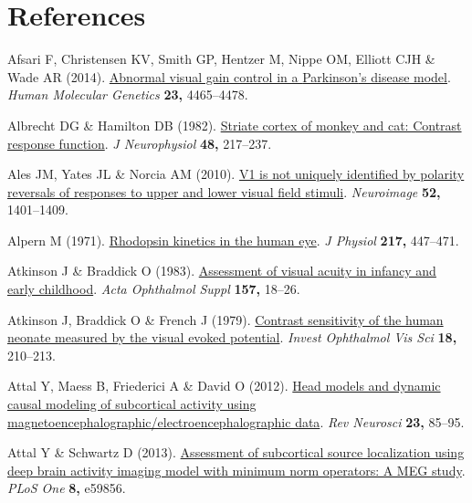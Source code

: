 \documentclass[
  letterpaper,
  DIV=11,
  numbers=noendperiod]{scrartcl}
\newlength{\cslhangindent}
\newenvironment{CSLReferences}[2] %
 {\begin{list}{}{%
  \setlength{\itemindent}{0pt}
  \setlength{\leftmargin}{0pt}
  \setlength{\parsep}{0pt}
  \ifodd #1
   \setlength{\leftmargin}{\cslhangindent}
   \setlength{\itemindent}{-1\cslhangindent}
  \fi
  \setlength{\itemsep}{#2\baselineskip}}}
 {\end{list}}
\begin{document}
\section*{References}\label{references}

\label{refs}
\begin{CSLReferences}{1}{1}
Afsari F, Christensen KV, Smith GP, Hentzer M, Nippe OM, Elliott CJH \&
Wade AR (2014). \href{https://doi.org/10.1093/hmg/ddu159}{Abnormal
visual gain control in a {Parkinson}'s disease model}. \emph{Human
Molecular Genetics} \textbf{23,} 4465--4478.

Albrecht DG \& Hamilton DB (1982).
\href{https://doi.org/10.1152/jn.1982.48.1.217}{Striate cortex of monkey
and cat: Contrast response function}. \emph{J Neurophysiol} \textbf{48,}
217--237.

Ales JM, Yates JL \& Norcia AM (2010).
\href{https://doi.org/10.1016/j.neuroimage.2010.05.016}{V1 is not
uniquely identified by polarity reversals of responses to upper and
lower visual field stimuli}. \emph{Neuroimage} \textbf{52,} 1401--1409.

Alpern M (1971).
\href{https://doi.org/10.1113/jphysiol.1971.sp009580}{Rhodopsin kinetics
in the human eye}. \emph{J Physiol} \textbf{217,} 447--471.

Atkinson J \& Braddick O (1983).
\href{https://doi.org/10.1111/j.1755-3768.1983.tb03927.x}{Assessment of
visual acuity in infancy and early childhood}. \emph{Acta Ophthalmol
Suppl} \textbf{157,} 18--26.

Atkinson J, Braddick O \& French J (1979).
\href{https://www.ncbi.nlm.nih.gov/pubmed/761974}{Contrast sensitivity
of the human neonate measured by the visual evoked potential}.
\emph{Invest Ophthalmol Vis Sci} \textbf{18,} 210--213.

Attal Y, Maess B, Friederici A \& David O (2012).
\href{https://doi.org/10.1515/rns.2011.056}{Head models and dynamic
causal modeling of subcortical activity using
magnetoencephalographic/electroencephalographic data}. \emph{Rev
Neurosci} \textbf{23,} 85--95.

Attal Y \& Schwartz D (2013).
\href{https://doi.org/10.1371/journal.pone.0059856}{Assessment of
subcortical source localization using deep brain activity imaging model
with minimum norm operators: A MEG study}. \emph{PLoS One} \textbf{8,}
e59856.


\end{CSLReferences}
\end{document}
